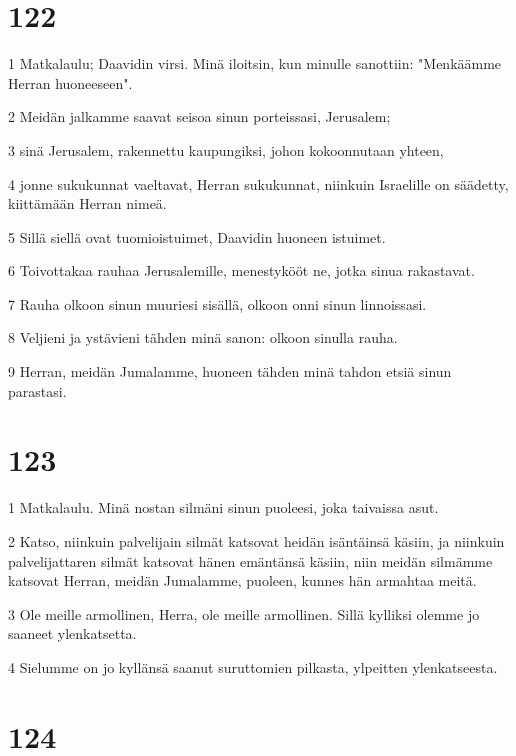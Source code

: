 \chapter{122}

\par 1 Matkalaulu; Daavidin virsi. Minä iloitsin, kun minulle sanottiin: "Menkäämme Herran huoneeseen".
\par 2 Meidän jalkamme saavat seisoa sinun porteissasi, Jerusalem;
\par 3 sinä Jerusalem, rakennettu kaupungiksi, johon kokoonnutaan yhteen,
\par 4 jonne sukukunnat vaeltavat, Herran sukukunnat, niinkuin Israelille on säädetty, kiittämään Herran nimeä.
\par 5 Sillä siellä ovat tuomioistuimet, Daavidin huoneen istuimet.
\par 6 Toivottakaa rauhaa Jerusalemille, menestykööt ne, jotka sinua rakastavat.
\par 7 Rauha olkoon sinun muuriesi sisällä, olkoon onni sinun linnoissasi.
\par 8 Veljieni ja ystävieni tähden minä sanon: olkoon sinulla rauha.
\par 9 Herran, meidän Jumalamme, huoneen tähden minä tahdon etsiä sinun parastasi.

\chapter{123}

\par 1 Matkalaulu. Minä nostan silmäni sinun puoleesi, joka taivaissa asut.
\par 2 Katso, niinkuin palvelijain silmät katsovat heidän isäntäinsä käsiin, ja niinkuin palvelijattaren silmät katsovat hänen emäntänsä käsiin, niin meidän silmämme katsovat Herran, meidän Jumalamme, puoleen, kunnes hän armahtaa meitä.
\par 3 Ole meille armollinen, Herra, ole meille armollinen. Sillä kylliksi olemme jo saaneet ylenkatsetta.
\par 4 Sielumme on jo kyllänsä saanut suruttomien pilkasta, ylpeitten ylenkatseesta.

\chapter{124}

